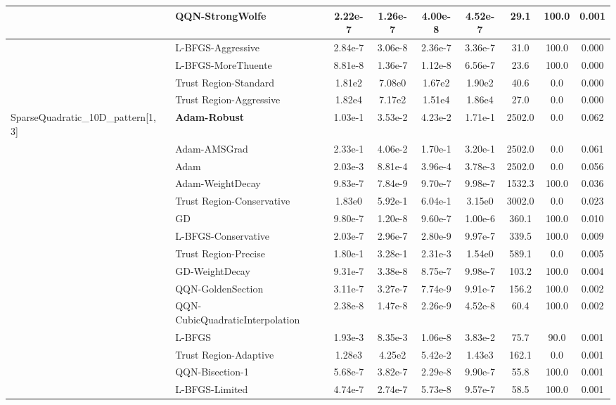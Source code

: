 \documentclass{article}
\begin{document}
\begin{longtable}{|l|l|c|c|c|c|c|c|c|}
\hline
 & QQN-StrongWolfe & 2.22e-7 & 1.26e-7 & 4.00e-8 & 4.52e-7 & 29.1 & 100.0 & 0.001 \\
\hline
 & L-BFGS-Aggressive & 2.84e-7 & 3.06e-8 & 2.36e-7 & 3.36e-7 & 31.0 & 100.0 & 0.000 \\
\hline
 & L-BFGS-MoreThuente & 8.81e-8 & 1.36e-7 & 1.12e-8 & 6.56e-7 & 23.6 & 100.0 & 0.000 \\
\hline
 & Trust Region-Standard & 1.81e2 & 7.08e0 & 1.67e2 & 1.90e2 & 40.6 & 0.0 & 0.000 \\
\hline
 & Trust Region-Aggressive & 1.82e4 & 7.17e2 & 1.51e4 & 1.86e4 & 27.0 & 0.0 & 0.000 \\
SparseQuadratic\_10D\_pattern[1, 3] & \textbf{Adam-Robust} & 1.03e-1 & 3.53e-2 & 4.23e-2 & 1.71e-1 & 2502.0 & 0.0 & 0.062 \\
\hline
 & Adam-AMSGrad & 2.33e-1 & 4.06e-2 & 1.70e-1 & 3.20e-1 & 2502.0 & 0.0 & 0.061 \\
\hline
 & Adam & 2.03e-3 & 8.81e-4 & 3.96e-4 & 3.78e-3 & 2502.0 & 0.0 & 0.056 \\
\hline
 & Adam-WeightDecay & 9.83e-7 & 7.84e-9 & 9.70e-7 & 9.98e-7 & 1532.3 & 100.0 & 0.036 \\
\hline
 & Trust Region-Conservative & 1.83e0 & 5.92e-1 & 6.04e-1 & 3.15e0 & 3002.0 & 0.0 & 0.023 \\
\hline
 & GD & 9.80e-7 & 1.20e-8 & 9.60e-7 & 1.00e-6 & 360.1 & 100.0 & 0.010 \\
\hline
 & L-BFGS-Conservative & 2.03e-7 & 2.96e-7 & 2.80e-9 & 9.97e-7 & 339.5 & 100.0 & 0.009 \\
\hline
 & Trust Region-Precise & 1.80e-1 & 3.28e-1 & 2.31e-3 & 1.54e0 & 589.1 & 0.0 & 0.005 \\
\hline
 & GD-WeightDecay & 9.31e-7 & 3.38e-8 & 8.75e-7 & 9.98e-7 & 103.2 & 100.0 & 0.004 \\
\hline
 & QQN-GoldenSection & 3.11e-7 & 3.27e-7 & 7.74e-9 & 9.91e-7 & 156.2 & 100.0 & 0.002 \\
\hline
 & QQN-CubicQuadraticInterpolation & 2.38e-8 & 1.47e-8 & 2.26e-9 & 4.52e-8 & 60.4 & 100.0 & 0.002 \\
\hline
 & L-BFGS & 1.93e-3 & 8.35e-3 & 1.06e-8 & 3.83e-2 & 75.7 & 90.0 & 0.001 \\
\hline
 & Trust Region-Adaptive & 1.28e3 & 4.25e2 & 5.42e-2 & 1.43e3 & 162.1 & 0.0 & 0.001 \\
\hline
 & QQN-Bisection-1 & 5.68e-7 & 3.82e-7 & 2.29e-8 & 9.90e-7 & 55.8 & 100.0 & 0.001 \\
\hline
 & L-BFGS-Limited & 4.74e-7 & 2.74e-7 & 5.73e-8 & 9.57e-7 & 58.5 & 100.0 & 0.001 \\

\end{longtable}
\end{document}
